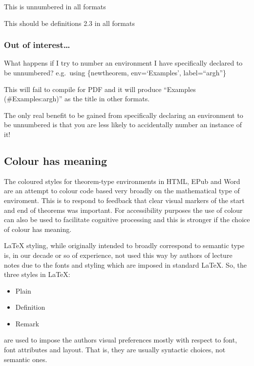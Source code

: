 \documentclass[
  10pt,
  a4paper]{article}
\providecommand{\tightlist}{%
  \setlength{\itemsep}{0pt}\setlength{\parskip}{0pt}}
\theoremstyle{plain}
\theoremstyle{definition}
\theoremstyle{plain}
\theoremstyle{plain}
\theoremstyle{plain}
\theoremstyle{plain}
\theoremstyle{definition}
\theoremstyle{definition}
\theoremstyle{remark}
\theoremstyle{remark}
\let\BeginKnitrBlock\begin \let\EndKnitrBlock\end
\begin{document}
\BeginKnitrBlock{Definitions*}
{}This is unnumbered in all formats
\EndKnitrBlock{Definitions*}

\BeginKnitrBlock{Definitions}
{\label{Def:def3}}This should be definitions 2.3 in all formats
\EndKnitrBlock{Definitions}

\hypertarget{out-of-interest}{%
\subsubsection{Out of interest\ldots{}}\label{out-of-interest}}

What happens if I try to number an environment I have specifically declared to be unnumbered? e.g.~using \{newtheorem, env=`Examples', label=``argh''\}

This will fail to compile for PDF and it will produce ``Examples (\#Examples:argh)'' as the title in other formats.

The only real benefit to be gained from specifically declaring an environment to be unnumbered is that you are less likely to accidentally number an instance of it!

\hypertarget{colour-has-meaning}{%
\subsection{Colour has meaning}\label{colour-has-meaning}}

The coloured styles for theorem-type environments in HTML, EPub and Word are an attempt to colour code based very broadly on the mathematical type of enviroment. This is to respond to feedback that clear visual markers of the start and end of theorems was important. For accessibility purposes the use of colour can also be used to facilitate cognitive processing and this is stronger if the choice of colour has meaning.

LaTeX styling, while originally intended to broadly correspond to semantic type is, in our decade or so of experience, not used this way by authors of lecture notes due to the fonts and styling which are imposed in standard LaTeX. So, the three styles in LaTeX:

\begin{itemize}
\tightlist
\item
  Plain
\item
  Definition
\item
  Remark
\end{itemize}

are used to impose the authors visual preferences mostly with respect to font, font attributes and layout. That is, they are usually syntactic choices, not semantic ones.
\end{document}
